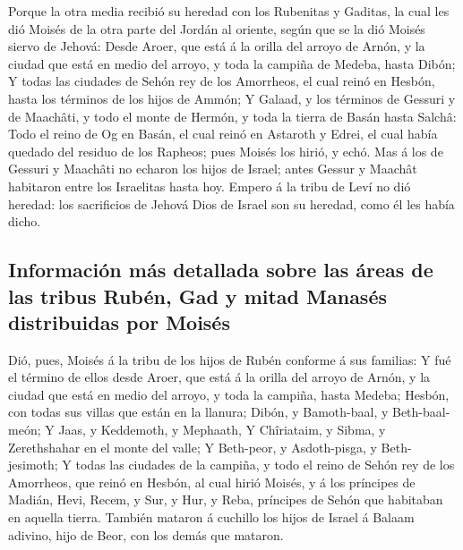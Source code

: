  Porque la otra media recibió su heredad con los Rubenitas y
Gaditas, la cual les dió Moisés de la otra parte del Jordán al oriente,
según que se la dió Moisés siervo de Jehová:  Desde Aroer,
que está á la orilla del arroyo de Arnón, y la ciudad que está en medio
del arroyo, y toda la campiña de Medeba, hasta Dibón;  Y
todas las ciudades de Sehón rey de los Amorrheos, el cual reinó en
Hesbón, hasta los términos de los hijos de Ammón;  Y
Galaad, y los términos de Gessuri y de Maachâti, y todo el monte de
Hermón, y toda la tierra de Basán hasta Salchâ:  Todo el
reino de Og en Basán, el cual reinó en Astaroth y Edrei, el cual había
quedado del residuo de los Rapheos; pues Moisés los hirió, y echó.
 Mas á los de Gessuri y Maachâti no echaron los hijos de
Israel; antes Gessur y Maachât habitaron entre los Israelitas hasta hoy.
 Empero á la tribu de Leví no dió heredad: los sacrificios
de Jehová Dios de Israel son su heredad, como él les había dicho.

\hypertarget{informaciuxf3n-muxe1s-detallada-sobre-las-uxe1reas-de-las-tribus-rubuxe9n-gad-y-mitad-manasuxe9s-distribuidas-por-moisuxe9s}{%
\subsection{Información más detallada sobre las áreas de las tribus
Rubén, Gad y mitad Manasés distribuidas por
Moisés}\label{informaciuxf3n-muxe1s-detallada-sobre-las-uxe1reas-de-las-tribus-rubuxe9n-gad-y-mitad-manasuxe9s-distribuidas-por-moisuxe9s}}

 Dió, pues, Moisés á la tribu de los hijos de Rubén
conforme á sus familias:  Y fué el término de ellos desde
Aroer, que está á la orilla del arroyo de Arnón, y la ciudad que está en
medio del arroyo, y toda la campiña, hasta Medeba;  Hesbón,
con todas sus villas que están en la llanura; Dibón, y Bamoth-baal, y
Beth-baal-meón;  Y Jaas, y Keddemoth, y Mephaath,
 Y Chîriataim, y Sibma, y Zerethshahar en el monte del
valle;  Y Beth-peor, y Asdoth-pisga, y Beth-jesimoth;
 Y todas las ciudades de la campiña, y todo el reino de
Sehón rey de los Amorrheos, que reinó en Hesbón, al cual hirió Moisés, y
á los príncipes de Madián, Hevi, Recem, y Sur, y Hur, y Reba, príncipes
de Sehón que habitaban en aquella tierra.  También mataron
á cuchillo los hijos de Israel á Balaam adivino, hijo de Beor, con los
demás que mataron.

